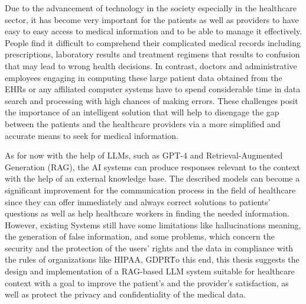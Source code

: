 Due to the advancement of technology in the society especially in the healthcare sector, it has become very important for the patients as well as providers to have easy to easy access to medical information and to be able to manage it effectively. People find it difficult to comprehend their complicated medical records including prescriptions, laboratory results and treatment regimens that results to confusion that may lead to wrong health decisions. In contrast, doctors and administrative employees engaging in computing these large patient data obtained from the EHRs or any affiliated computer systems have to spend considerable time in data search and processing with high chances of making errors. These challenges posit the importance of an intelligent solution that will help to disengage the gap between the patients and the healthcare providers via a more simplified and accurate means to seek for medical information.

As for now with the help of LLMs, such as GPT-4 and Retrieval-Augmented Generation (RAG), the AI systems can produce responses relevant to the context with the help of an external knowledge base. The described models can become a significant improvement for the communication process in the field of healthcare since they can offer immediately and always correct solutions to patients' questions as well as help healthcare workers in finding the needed information. However, existing Systems still have some limitations like hallucinations meaning, the generation of false information, and some problems, which concern the security and the protection of the users' rights and the data in compliance with the rules of organizations like HIPAA, GDPR\. To this end, this thesis suggests the design and implementation of a RAG-based LLM system suitable for healthcare context with a goal to improve the patient's and the provider's satisfaction, as well as protect the privacy and confidentiality of the medical data.